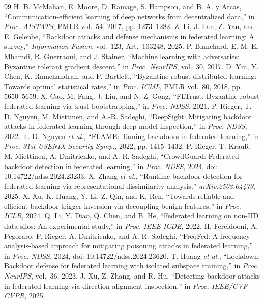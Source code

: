 \begin{thebibliography}{99}
 H. B. McMahan, E. Moore, D. Ramage, S. Hampson, and B. A. y Arcas, ``Communication-efficient learning of deep networks from decentralized data,'' in \emph{Proc. AISTATS}, PMLR vol.~54, 2017, pp. 1273--1282.
 Z. Li, J. Lan, Z. Yan, and E. Gelenbe, ``Backdoor attacks and defense mechanisms in federated learning: A survey,'' \emph{Information Fusion}, vol.~123, Art.~103248, 2025.
 P. Blanchard, E. M. El Mhamdi, R. Guerraoui, and J. Stainer, ``Machine learning with adversaries: Byzantine tolerant gradient descent,'' in \emph{Proc. NeurIPS}, vol.~30, 2017.
 D. Yin, Y. Chen, K. Ramchandran, and P. Bartlett, ``Byzantine-robust distributed learning: Towards optimal statistical rates,'' in \emph{Proc. ICML}, PMLR vol.~80, 2018, pp. 5650--5659.
 X. Cao, M. Fang, J. Liu, and N. Z. Gong, ``FLTrust: Byzantine-robust federated learning via trust bootstrapping,'' in \emph{Proc. NDSS}, 2021.
 P. Rieger, T. D. Nguyen, M. Miettinen, and A.-R. Sadeghi, ``DeepSight: Mitigating backdoor attacks in federated learning through deep model inspection,'' in \emph{Proc. NDSS}, 2022.
 T. D. Nguyen \emph{et al.}, ``FLAME: Taming backdoors in federated learning,'' in \emph{Proc. 31st USENIX Security Symp.}, 2022, pp. 1415--1432.
 P. Rieger, T. Krau{\ss}, M. Miettinen, A. Dmitrienko, and A.-R. Sadeghi, ``CrowdGuard: Federated backdoor detection in federated learning,'' in \emph{Proc. NDSS}, 2024, doi: 10.14722/ndss.2024.23233.
 X. Zhang \emph{et al.}, ``Runtime backdoor detection for federated learning via representational dissimilarity analysis,'' \emph{arXiv:2503.04473}, 2025.
 X. Xu, K. Huang, Y. Li, Z. Qin, and K. Ren, ``Towards reliable and efficient backdoor trigger inversion via decoupling benign features,'' in \emph{Proc. ICLR}, 2024.
 Q. Li, Y. Diao, Q. Chen, and B. He, ``Federated learning on non-IID data silos: An experimental study,'' in \emph{Proc. IEEE ICDE}, 2022.
 H. Fereidooni, A. Pegoraro, P. Rieger, A. Dmitrienko, and A.-R. Sadeghi, ``FreqFed: A frequency analysis-based approach for mitigating poisoning attacks in federated learning,'' in \emph{Proc. NDSS}, 2024, doi: 10.14722/ndss.2024.23620.
 T. Huang \emph{et al.}, ``Lockdown: Backdoor defense for federated learning with isolated subspace training,'' in \emph{Proc. NeurIPS}, vol.~36, 2023.
 J. Xu, Z. Zhang, and R. Hu, ``Detecting backdoor attacks in federated learning via direction alignment inspection,'' in \emph{Proc. IEEE/CVF CVPR}, 2025.

\end{thebibliography}
